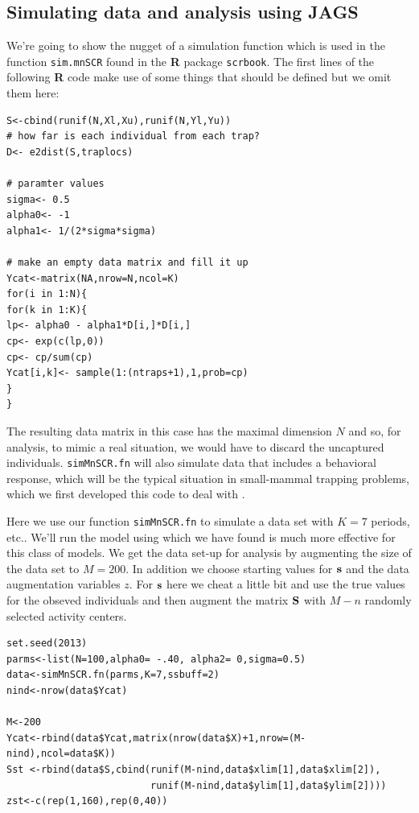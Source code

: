 \subsection{Simulating data and analysis using JAGS}

We're going to show the nugget of a simulation function which is
used in the function \mbox{\tt sim.mnSCR} found in the {\bf R} package
\mbox{\tt scrbook}.  The first lines of the following {\bf R} code
make use of some things that should be defined but we omit them here:
{\small
\begin{verbatim}
S<-cbind(runif(N,Xl,Xu),runif(N,Yl,Yu))
# how far is each individual from each trap?
D<- e2dist(S,traplocs)

# paramter values
sigma<- 0.5
alpha0<- -1
alpha1<- 1/(2*sigma*sigma)

# make an empty data matrix and fill it up
Ycat<-matrix(NA,nrow=N,ncol=K)
for(i in 1:N){
for(k in 1:K){
lp<- alpha0 - alpha1*D[i,]*D[i,]
cp<- exp(c(lp,0))
cp<- cp/sum(cp)
Ycat[i,k]<- sample(1:(ntraps+1),1,prob=cp)
}
}
\end{verbatim}
}
The resulting data matrix in this case has the maximal dimension $N$
and so, for analysis, to mimic a real situation, we would have to
discard the uncaptured individuals.  \mbox{\tt simMnSCR.fn} will also
simulate data that includes a behavioral response, which will be the
typical situation in small-mammal trapping problems, which we first
developed this code to deal with \citep[see][for
details]{converse_royle:2012}.

Here we use our function \mbox{\tt simMnSCR.fn} to simulate a data set
with $K=7$ periods, etc.. We'll run the model using \jags which
we have found is much more effective for this class of models.  We get
the data set-up for analysis by augmenting the size of the data set to
$M=200$. In addition we choose starting values for ${\bf s}$ and the
data augmentation variables $z$.  For ${\bf s}$ here we cheat a little
bit and use the true values for the obseved individuals and then
augment the matrix ${\bf S}$ with $M-n$ randomly selected activity
centers.

{\small
\begin{verbatim}
set.seed(2013)
parms<-list(N=100,alpha0= -.40, alpha2= 0,sigma=0.5)
data<-simMnSCR.fn(parms,K=7,ssbuff=2)
nind<-nrow(data$Ycat)

M<-200
Ycat<-rbind(data$Ycat,matrix(nrow(data$X)+1,nrow=(M-nind),ncol=data$K))
Sst <-rbind(data$S,cbind(runif(M-nind,data$xlim[1],data$xlim[2]),
                         runif(M-nind,data$ylim[1],data$ylim[2])))
zst<-c(rep(1,160),rep(0,40))
\end{verbatim}
}

